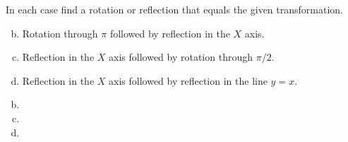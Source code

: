 \documentclass[../main.tex]{subfiles}
\begin{document}
In each case find a rotation or reflection that equals the given transformation.
\begin{enumerate}[a)]
	\setcounter{enumi}{1}
	\item Rotation through $\pi$ followed by reflection in the $X$ axis.
	\setcounter{enumi}{3}
	\item Reflection in the $X$ axis followed by rotation through $\pi/2$.
	\setcounter{enumi}{5}
	\item Reflection in the $X$ axis followed by reflection in the line $y = x$.
\end{enumerate}

\solution
\begin{enumerate}[a)]
	\setcounter{enumi}{1}
	\item 
	\setcounter{enumi}{3}
	\item 
	\setcounter{enumi}{5}
	\item 
\end{enumerate}
\end{document}
